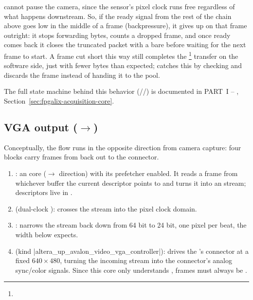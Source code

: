  cannot pause the camera, since the sensor's pixel clock runs free regardless of what happens downstream. So, if the  ready signal from the rest of the chain above goes low in the middle of a frame (backpressure), it gives up on that frame outright: it stops forwarding bytes, counts a dropped frame, and once ready comes back it closes the truncated packet with a bare  before waiting for the next frame to start. A frame cut short this way still completes the \footnote{} transfer on the software side, just with fewer bytes than expected;  catches this by checking  and discards the frame instead of handing it to the pool.

The full state machine behind this behavior (//) is documented in PART~I -- , Section~\ref{sec:fpgalix-acquisition-core}.

\subsection{VGA output ($\rightarrow$)}
\label{subsec:fpgasteel-simple-forwarding-vga-output}

Conceptually, the flow runs in the opposite direction from camera capture: four blocks carry frames from  back out to the  connector.

\begin{enumerate}
    \item \textbf{}: an  core ($\rightarrow$ direction) with its prefetcher enabled. It reads a frame from whichever  buffer the current descriptor points to and turns it into an  stream; descriptors live in .
    \item \textbf{} (dual-clock ): crosses the stream into the  pixel clock domain.
    \item \textbf{}: narrows the stream back down from 64 bit to 24 bit, one  pixel per beat, the width  below expects.
    \item \textbf{} (kind |altera_up_avalon_video_vga_controller|): drives the 's  connector at a fixed $640\times480$, turning the incoming  stream into the connector's analog sync/color signals. Since this core only understands ,  frames must always be .
\end{enumerate}

